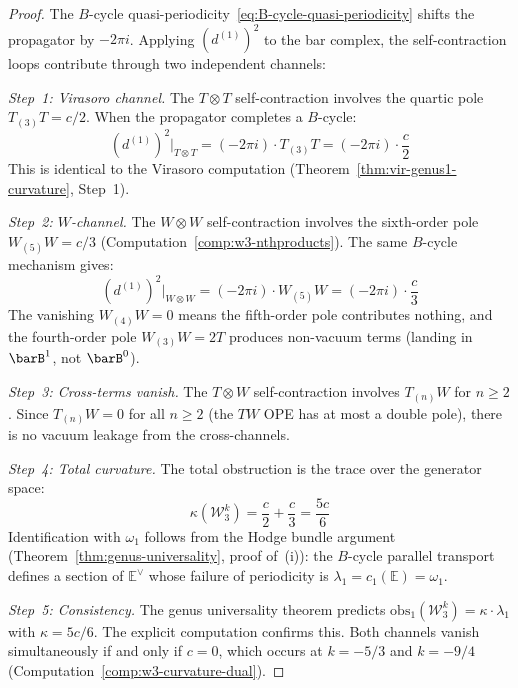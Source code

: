 \begin{proof}
The $B$-cycle quasi-periodicity~\eqref{eq:B-cycle-quasi-periodicity}
shifts the propagator by $-2\pi i$.  Applying $(d^{(1)})^2$ to the
bar complex, the self-contraction loops contribute through two
independent channels:

\emph{Step~1: Virasoro channel.}
The $T \otimes T$ self-contraction involves the quartic pole
$T_{(3)}T = c/2$.  When the propagator completes a $B$-cycle:
\begin{equation}
(d^{(1)})^2\big|_{T \otimes T} = (-2\pi i) \cdot T_{(3)}T
= (-2\pi i) \cdot \frac{c}{2}
\end{equation}
This is identical to the Virasoro computation
(Theorem~\ref{thm:vir-genus1-curvature}, Step~1).

\emph{Step~2: $W$-channel.}
The $W \otimes W$ self-contraction involves the sixth-order pole
$W_{(5)}W = c/3$ (Computation~\ref{comp:w3-nthproducts}).  The
same $B$-cycle mechanism gives:
\begin{equation}
(d^{(1)})^2\big|_{W \otimes W} = (-2\pi i) \cdot W_{(5)}W
= (-2\pi i) \cdot \frac{c}{3}
\end{equation}
The vanishing $W_{(4)}W = 0$ means the fifth-order pole
contributes nothing, and the fourth-order pole $W_{(3)}W = 2T$
produces non-vacuum terms (landing in $\barB^1$, not $\barB^0$).

\emph{Step~3: Cross-terms vanish.}
The $T \otimes W$ self-contraction involves $T_{(n)}W$ for $n \geq 2$.
Since $T_{(n)}W = 0$ for all $n \geq 2$ (the $TW$ OPE has at most a
double pole), there is no vacuum leakage from the cross-channels.

\emph{Step~4: Total curvature.}
The total obstruction is the trace over the generator space:
\begin{equation}
\kappa(\mathcal{W}_3^k) = \frac{c}{2} + \frac{c}{3} = \frac{5c}{6}
\end{equation}
Identification with $\omega_1$ follows from the Hodge bundle argument
(Theorem~\ref{thm:genus-universality}, proof of~(i)): the $B$-cycle
parallel transport defines a section of $\mathbb{E}^\vee$ whose
failure of periodicity is $\lambda_1 = c_1(\mathbb{E}) = \omega_1$.

\emph{Step~5: Consistency.}
The genus universality theorem predicts
$\mathrm{obs}_1(\mathcal{W}_3^k) = \kappa \cdot \lambda_1$ with
$\kappa = 5c/6$.  The explicit computation confirms this.
Both channels vanish simultaneously if and only if $c = 0$,
which occurs at $k = -5/3$ and $k = -9/4$
(Computation~\ref{comp:w3-curvature-dual}).
\end{proof}

